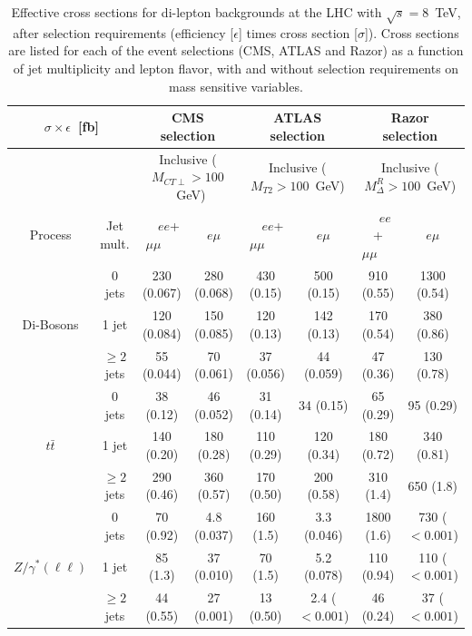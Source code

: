\begin{table}[ht]
\begin{tabular}{|c|c|c|c|c|c|c|c|} \hline
 \multicolumn{2}{|c|}{$\sigma \times \epsilon$~[fb]}   & \multicolumn{2}{|c|}{CMS selection} & \multicolumn{2}{|c|}{ATLAS selection} & \multicolumn{2}{|c|}{Razor selection} \\ \hline
 \multicolumn{2}{|c|}{}  & \multicolumn{2}{|c|}{Inclusive ($M_{CT\perp} > 100$~GeV)} & \multicolumn{2}{|c|}{Inclusive ($M_{T2} > 100$~GeV)} &\multicolumn{2}{|c|}{Inclusive ($M_{\Delta}^{R} > 100$~GeV)} \\ \hline
Process & Jet mult. & $~~~~~ ee$+$\mu\mu ~~~~~~$ & $e\mu$  & $~~~~~ ee$+$\mu\mu ~~~~~~$ & $e\mu$ & $~~~~~ ee$+$\mu\mu ~~~~~~$ & $e\mu$ \\ \hline
                     & 0 jets            &  230 (0.067) & 280 (0.068) & 430 (0.15) & 500 (0.15) & 910 (0.55) & 1300 (0.54) \\ 
Di-Bosons  & 1 jet              &  120 (0.084) & 150 (0.085) & 120 (0.13) & 142 (0.13) & 170 (0.54) & 380 (0.86) \\ 
                     & $\ge 2$ jets &  55 (0.044) & 70 (0.061) & 37 (0.056) & 44 (0.059) & 47 (0.36) & 130 (0.78) \\ \hline         
                     & 0 jets            & 38 (0.12) & 46 (0.052) & 31 (0.14) & 34 (0.15) & 65 (0.29) & 95 (0.29) \\ 
$t\bar{t}$     & 1 jet              & 140 (0.20) & 180 (0.28) & 110 (0.29) & 120 (0.34) & 180 (0.72) & 340 (0.81) \\ 
                     & $\ge 2$ jets & 290 (0.46) & 360 (0.57) & 170 (0.50) & 200 (0.58) & 310 (1.4) & 650 (1.8) \\ \hline  
                     & 0 jets            &  70 (0.92) & 4.8 (0.037) & 160 (1.5) & 3.3 (0.046) & 1800 (1.6) & 730 ($< 0.001$)  \\ 
$Z/\gamma^*(\ell\ell)$  & 1 jet & 85 (1.3) & 37 (0.010) & 70 (1.5) & 5.2 (0.078) & 110 (0.94) & 110 ($< 0.001$)  \\ 
                     & $\ge 2$ jets & 44 (0.55) & 27 (0.001) & 13 (0.50) & 2.4 ($< 0.001$) & 46 (0.24) & 37 ($< 0.001$) \\ \hline           

\end{tabular}
\caption{Effective cross sections for di-lepton backgrounds at the LHC with $\sqrt{s} = 8$~TeV, after selection requirements (efficiency [$\epsilon$] times cross section [$\sigma$]). Cross sections are listed for each of the event selections (CMS, ATLAS and Razor) as a function of jet multiplicity and lepton flavor, with and without selection requirements on mass sensitive variables. \label{tab:BKG} }
\end{table}

